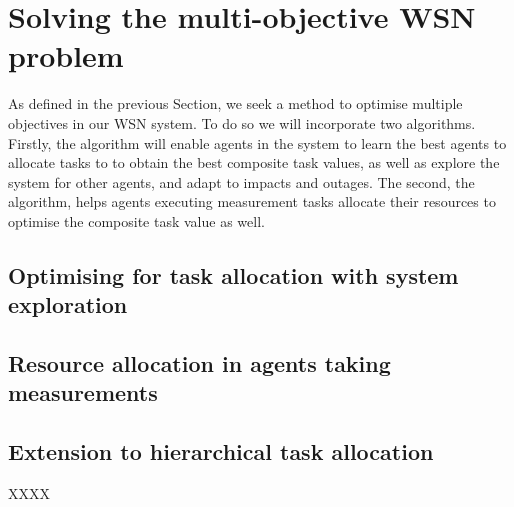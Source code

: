 \section{Solving the multi-objective WSN problem}
\label{section:solution}
As defined in the previous Section, we seek a method to optimise multiple objectives in our WSN system. To do so we will incorporate two algorithms. Firstly, the \acronymATARIAExtended{}{} algorithm will enable agents in the system to learn the best agents to allocate tasks to to obtain the best composite task values, as well as explore the system for other agents, and adapt to impacts and outages. The second, the \acronymMGRAOExtended{}{} algorithm, helps agents executing measurement tasks allocate their resources to optimise the composite task value as well.


\newcommand{\formalATARIA}[2]{
	\functionFormal{ataria}
	{XXX}
	{\powerSetAgents{}{} \times \powerSetAgents{}{} \times (\setAction{}{} \times \setRealNumbers{}{})}
}

\subsection{Optimising for task allocation with system exploration}

\subsection{Resource allocation in agents taking measurements}

\subsection{Extension to hierarchical task allocation}

XXXX


